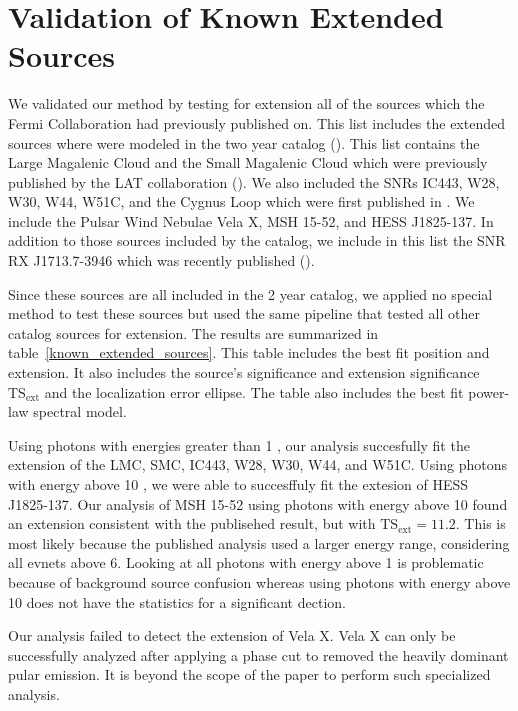 \documentclass[12pt,preprint]{aastex}
\newcommand{\gev}{\text{GeV}\xspace}
\newcommand{\tsext}{{\ensuremath{\text{TS}_\text{ext}}}\xspace}
\newcommand{\ts}{\text{TS}\xspace}
\begin{document}


\section{Validation of Known Extended Sources}
\label{validate_known}

We validated our method by testing for extension all of the sources
which the Fermi Collaboration had previously published on.  This list
includes the extended sources where were modeled in the two year catalog
(\cite{second_cat}).  This list contains the Large Magalenic Cloud
and the Small Magalenic Cloud which were previously published by the
LAT collaboration (\cite{lmc,smc}).  We also included the SNRs IC443, W28, W30, W44, W51C, and the Cygnus Loop which
were first published in \cite{ic443,w28,w30,w44,w51c,cygnus_loop}.
We include the Pulsar Wind Nebulae Vela X, MSH 15-52, and HESS
J1825-137\cite{velax,msh1552,fermi_hess_j1825}.  In addition to those
sources included by the catalog, we include in this list the SNR RX J1713.7-3946 which was recently published (\cite{RXJ1713}).

Since these sources are all included in the 2 year catalog, we applied
no special method to test these sources but used the same pipeline
that tested all other catalog sources for extension.  The results are
summarized in table~\ref{known_extended_sources}.  This table includes
the best fit position and extension. It also includes the source's
significance \ts and extension significance \tsext and the localization
error ellipse. The table also includes the best fit power-law spectral
model.

Using photons with energies greater than 1 \gev, our analysis succesfully
fit the extension of the LMC, SMC, IC443, W28, W30, W44, and W51C.
Using photons with energy above 10 \gev, we were able to succesffuly
fit the extesion of HESS J1825-137.
Our analysis of MSH 15-52 using photons with energy above 10 \gev found an extension
consistent with the publisehed result, but with $\tsext=11.2$. This is
most likely because the published analysis used a larger energy range,
considering all evnets above 6\gev. Looking at all photons with
energy above 1\gev 
is problematic because of background source confusion whereas using photons
with energy above 10\gev does not have the statistics for a significant dection.

Our analysis failed to detect the extension of Vela X. Vela X can only be
successfully analyzed after applying a phase cut to removed the heavily
dominant pular emission. It is beyond the scope of the paper to perform
such specialized analysis.
\end{document}
